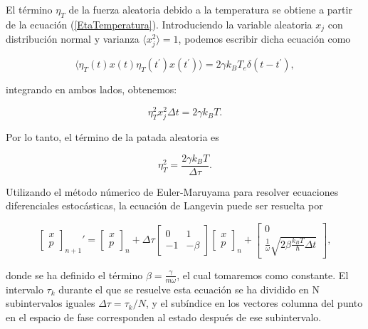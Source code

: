 \documentclass[letterpaper,12pt,oneside]{book}
\begin{document}
	
	
	 El t\'ermino $\eta_T$ de la fuerza aleatoria debido a la temperatura se obtiene a partir de la ecuaci\'on (\ref{EtaTemperatura}). Introduciendo la variable aleatoria $x_j$ con distribuci\'on normal y varianza $\langle x_j^2 \rangle = 1$, podemos escribir dicha ecuaci\'on como
	
	\begin{equation}
		\langle \eta_T(t)x(t)\eta_T(t^{'})x(t^{'}) \rangle = 2\gamma k_BT_e\delta(t-t^{'
		}),
	\end{equation}
	
	\noindent integrando en ambos lados, obtenemos:
	
	\begin{equation}
		\eta_T^2x_j^2\Delta t = 2\gamma k_B T.
	\end{equation}
	
	Por lo tanto, el t\'ermino de la patada aleatoria es
	
	\begin{equation}\label{EtaTemperaturaCalculado}
		\eta_T^2 = \frac{2\gamma k_BT}{\Delta \tau}.
	\end{equation}
	
	Utilizando el m\'etodo n\'umerico de Euler-Maruyama para resolver ecuaciones diferenciales estoc\'asticas, la ecuaci\'on de Langevin puede ser resuelta por
	
	\begin{equation}
		\begin{bmatrix}
		x \\ p
		\end{bmatrix}_{n+1}' = 
		\begin{bmatrix}
		x \\ p
		\end{bmatrix}_{n}
		+ \Delta\tau
		\begin{bmatrix}
		0 & 1 \\
		-1 & -\beta
		\end{bmatrix}
		\begin{bmatrix}
		x \\ p
		\end{bmatrix}_n
		+
		\begin{bmatrix}
		0 \\ \frac{1}{\omega}\sqrt{ 2\beta\frac{k_BT}{\hbar}{\Delta t} }
		\end{bmatrix},
	\end{equation}
	
	\noindent donde se ha definido el t\'ermino $\beta = \frac{\gamma}{m\omega}$, el cual tomaremos como constante. El intervalo $\tau_k$ durante el que se resuelve esta ecuaci\'on se ha dividido en N subintervalos iguales $\Delta\tau = \tau_k / N$, y el sub\'indice en los vectores columna del punto en el espacio de fase corresponden al estado despu\'es de ese subintervalo.
	
\end{document}
